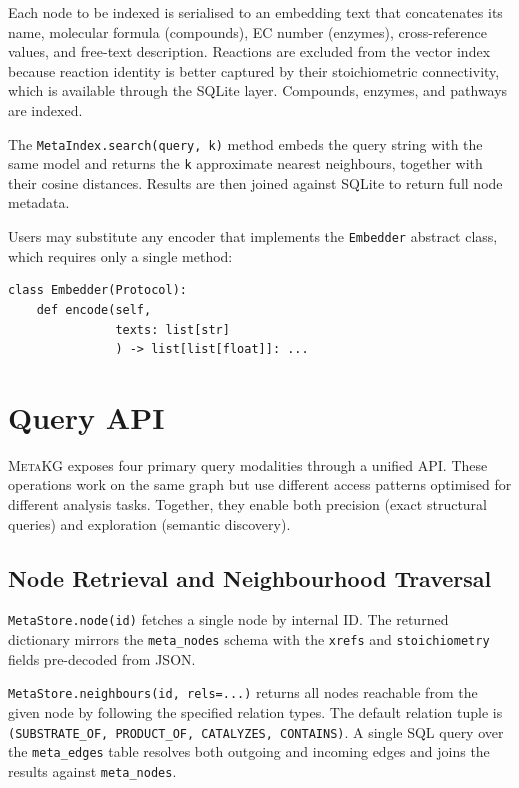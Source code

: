 \documentclass[10pt]{article}
\begin{document}
Each node to be indexed is serialised to an embedding text that concatenates
its name, molecular formula (compounds), EC number (enzymes), cross-reference
values, and free-text description. Reactions are excluded from the vector
index because reaction identity is better captured by their stoichiometric
connectivity, which is available through the SQLite layer. Compounds, enzymes,
and pathways are indexed.

The \texttt{MetaIndex.search(query, k)} method embeds the query string with
the same model and returns the \texttt{k} approximate nearest neighbours,
together with their cosine distances. Results are then joined against SQLite
to return full node metadata.

Users may substitute any encoder that implements the \texttt{Embedder}
abstract class, which requires only a single method:

\begin{lstlisting}[style=python]
class Embedder(Protocol):
    def encode(self,
               texts: list[str]
               ) -> list[list[float]]: ...
\end{lstlisting}

\section{Query API}
\label{sec:query}

\textsc{MetaKG} exposes four primary query modalities through a unified API.
These operations work on the same graph but use different access patterns
optimised for different analysis tasks. Together, they enable both precision
(exact structural queries) and exploration (semantic discovery).

\subsection{Node Retrieval and Neighbourhood Traversal}

\texttt{MetaStore.node(id)} fetches a single node by internal ID. The
returned dictionary mirrors the \texttt{meta\_nodes} schema with
the \texttt{xrefs} and \texttt{stoichiometry} fields pre-decoded from JSON.

\texttt{MetaStore.neighbours(id, rels=...)} returns all nodes reachable
from the given node by following the specified relation types. The default
relation tuple is \texttt{(SUBSTRATE\_OF, PRODUCT\_OF, CATALYZES, CONTAINS)}.
A single SQL query over the \texttt{meta\_edges} table resolves both
outgoing and incoming edges and joins the results against \texttt{meta\_nodes}.
\end{document}
